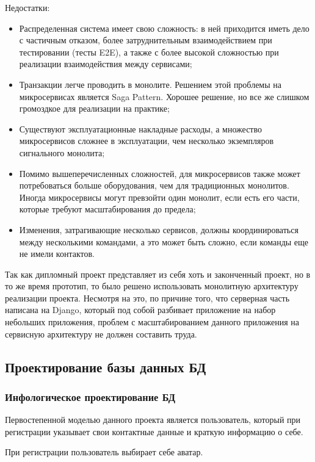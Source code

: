Недостатки:
\begin{itemize}
    \item Распределенная система имеет свою сложность: в ней приходится иметь дело с частичным отказом, более затруднительным взаимодействием при тестировании (тесты E2E), а также с более высокой сложностью при реализации взаимодействия между сервисами;
    \item Транзакции легче проводить в монолите.
    Решением этой проблемы на микросервисах является Saga Pattern.
    Хорошее решение, но все же слишком громоздкое для реализации на практике;
    \item Существуют эксплуатационные накладные расходы, а множество микросервисов сложнее в эксплуатации, чем несколько экземпляров сигнального монолита;
    \item Помимо вышеперечисленных сложностей, для микросервисов также может потребоваться больше оборудования, чем для традиционных монолитов.
    Иногда микросервисы могут превзойти один монолит, если есть его части, которые требуют масштабирования до предела;
    \item Изменения, затрагивающие несколько сервисов, должны координироваться между несколькими командами, а это может быть сложно, если команды еще не имели контактов.


\end{itemize}
\bigbreak

Так как дипломный проект представляет из себя хоть и законченный проект, но в то же время прототип, то было решено использовать монолитную архитектуру реализации проекта.
Несмотря на это, по причине того, что серверная часть написана на Django, который под собой разбивает приложение на набор небольших приложения, проблем с масштабированием данного приложения на сервисную архитектуру не должен составить труда.


\subsection{Проектирование базы данных БД}

\subsubsection{Инфологическое проектирование БД}\hfill

Первостепенной моделью данного проекта является пользователь, который при регистрации указывает свои контактные данные и краткую информацию о себе.

При регистрации пользователь выбирает себе аватар.

